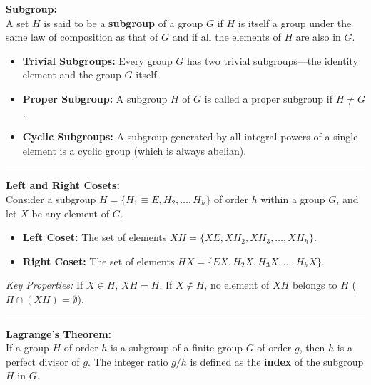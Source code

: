 \documentclass[11pt, a4paper]{report}
\begin{document}
\textbf{Subgroup:} \\
A set $H$ is said to be a \textbf{subgroup} of a group $G$ if $H$ is itself a group under the same law of composition as that of $G$ and if all the elements of $H$ are also in $G$.
\begin{itemize}
    \item \textbf{Trivial Subgroups:} Every group $G$ has two trivial subgroups—the identity element and the group $G$ itself.
    \item \textbf{Proper Subgroup:} A subgroup $H$ of $G$ is called a proper subgroup if $H \neq G$.
    \item \textbf{Cyclic Subgroups:} A subgroup generated by all integral powers of a single element is a cyclic group (which is always abelian).
\end{itemize}

\vspace{1em}
\hrule
\vspace{1em}

\textbf{Left and Right Cosets:} \\
Consider a subgroup $H = \{H_1 \equiv E, H_2, \dots, H_h\}$ of order $h$ within a group $G$, and let $X$ be any element of $G$.
\begin{itemize}
    \item \textbf{Left Coset:} The set of elements $XH = \{XE, XH_2, XH_3, \dots, XH_h\}$.
    \item \textbf{Right Coset:} The set of elements $HX = \{EX, H_2X, H_3X, \dots, H_hX\}$.
\end{itemize}
\textit{Key Properties:} If $X \in H$, $XH = H$. If $X \notin H$, no element of $XH$ belongs to $H$ ($H \cap (XH) = \emptyset$).

\vspace{1em}
\hrule
\vspace{1em}

\textbf{Lagrange's Theorem:} \\
If a group $H$ of order $h$ is a subgroup of a finite group $G$ of order $g$, then $h$ is a perfect divisor of $g$. The integer ratio $g/h$ is defined as the \textbf{index} of the subgroup $H$ in $G$.
\end{document}
